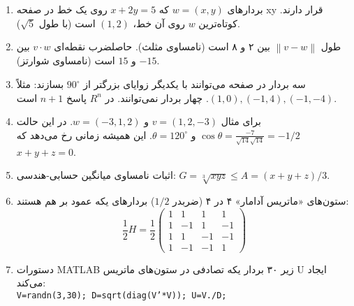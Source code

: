 \documentclass[12pt,a4paper]{article}
\newcommand{\norm}[1]{\left\lVert#1\right\rVert}
\begin{document}
{\begin{enumerate}
			\item بردارهای $w=(x,y)$ که $x+2y=5$ روی یک خط در صفحه xy قرار دارند. کوتاه‌ترین $w$ روی آن خط، $(1,2)$ است (با طول $\sqrt{5}$).
			
			\item طول $\norm{v-w}$ بین ۲ و ۸ است (نامساوی مثلث). حاصلضرب نقطه‌ای $v \cdot w$ بین $-15$ و $15$ است (نامساوی شوارتز).
			
			\item سه بردار در صفحه می‌توانند با یکدیگر زوایای بزرگتر از $90^\circ$ بسازند: مثلاً $(1,0), (-1,4), (-1,-4)$. چهار بردار نمی‌توانند. در $R^n$ پاسخ $n+1$ است.
			
			\item برای مثال $v=(1,2,-3)$ و $w=(-3,1,2)$. در این حالت $\cos\theta = \frac{-7}{\sqrt{14}\sqrt{14}} = -1/2$ و $\theta=120^\circ$. این همیشه زمانی رخ می‌دهد که $x+y+z=0$.
			
			\item اثبات نامساوی میانگین حسابی-هندسی: $G = \sqrt[3]{xyz} \le A=(x+y+z)/3$.
			
			\item ستون‌های «ماتریس آدامار» ۴ در ۴ (ضربدر $1/2$) بردارهای یکه عمود بر هم هستند:
			\[ \frac{1}{2}H = \frac{1}{2} \begin{pmatrix} 1 & 1 & 1 & 1 \\ 1 & -1 & 1 & -1 \\ 1 & 1 & -1 & -1 \\ 1 & -1 & -1 & 1 \end{pmatrix} \]
			
			\item دستورات MATLAB زیر ۳۰ بردار یکه تصادفی در ستون‌های ماتریس U ایجاد می‌کند: \\
			\texttt{V=randn(3,30); D=sqrt(diag(V'*V)); U=V./D;}
			
		\end{enumerate}
		
	}
\end{document}
